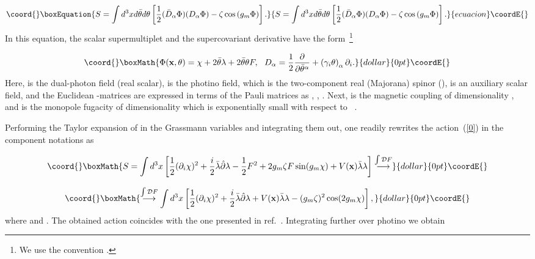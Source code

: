 \documentclass[a4paper,12pt]{article}
\begin{document}
\begin{equation}\coord{}\boxEquation{
\label{0}
S=\int d^3xd\bar\theta d\theta\left[\frac12(\bar D_\alpha\Phi)(D_\alpha\Phi)-\zeta\cos\left(g_m\Phi\right)\right].
}{
S=\int d^3xd\bar\theta d\theta\left[\frac12(\bar D_\alpha\Phi)(D_\alpha\Phi)-\zeta\cos\left(g_m\Phi\right)\right].
}{ecuacion}\coordE{}\end{equation}
In this equation, the scalar supermultiplet and
the supercovariant derivative have the form~\footnote{We use the convention \coordHE{}.}

$$\coord{}\boxMath{\Phi({\bf x},\theta)=\chi+2\bar\theta\lambda+2\bar\theta\theta F,~~
D_\alpha=\frac12\frac{\partial}{\partial\bar\theta^\alpha}+\left(\gamma_i\theta\right)_\alpha\partial_i.}{dollar}{0pt}\coordE{}$$
Here, \myHighlight{$\chi$}\coordHE{} is the dual-photon field (real scalar), \myHighlight{$\lambda$}\coordHE{} is the photino field,
which is the two-component real (Majorana) spinor (\coordHE{}),
\coordHE{} is an auxiliary scalar field, and the Euclidean \myHighlight{$\gamma$}\coordHE{}-matrices are
expressed in terms of the Pauli matrices as \coordHE{}, \coordHE{}, \coordHE{}.
Next, \coordHE{} is the magnetic coupling of dimensionality \coordHE{},
and \myHighlight{$\zeta$}\coordHE{} is the monopole fugacity of dimensionality \coordHE{} which is
exponentially small with respect to \coordHE{}~\cite{1, ahw}.

Performing the Taylor expansion of \coordHE{} in the Grassmann variables and integrating them out, one
readily rewrites the action~(\ref{0}) in the component notations as

$$\coord{}\boxMath{S=\int d^3x\left[\frac12(\partial_i\chi)^2+\frac{i}{2}\bar\lambda\hat\partial\lambda-\frac12F^2+2g_m\zeta F\sin(g_m\chi)+
V({\bf x})\bar\lambda\lambda\right]\stackrel{\int{\cal D}F}{\longrightarrow}}{dollar}{0pt}\coordE{}$$

$$\coord{}\boxMath{
\stackrel{\int{\cal D}F}{\longrightarrow}
\int d^3x\left[\frac12(\partial_i\chi)^2+\frac{i}{2}\bar\lambda\hat\partial\lambda+V({\bf x})\bar\lambda\lambda-
(g_m\zeta)^2\cos(2g_m\chi)\right],
}{dollar}{0pt}\coordE{}$$
where \coordHE{} and \coordHE{}. The obtained action
coincides with the one presented in ref.~\cite{ahw}. Integrating further over photino we obtain
\end{document}
